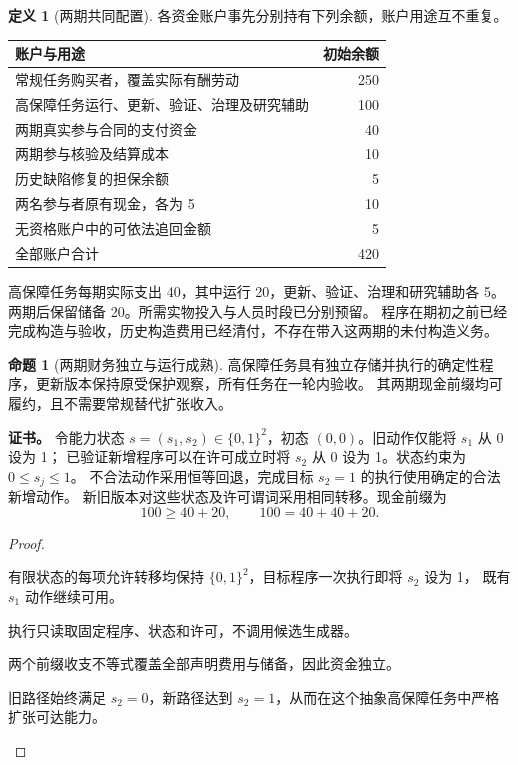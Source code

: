 \documentclass[UTF8,12pt,a4paper,openany,fontset=none,zihao=false]{ctexrep}
\theoremstyle{definition}
\newtheorem{definition}{定义}[chapter]
\newtheorem{proposition}{命题}[chapter]
\newenvironment{certificate}{\par\noindent\textbf{证书。}\ignorespaces}{\par}
\newcommand{\1}{\mathbf 1}
\begin{document}
\begin{definition}[两期共同配置]
各资金账户事先分别持有下列余额，账户用途互不重复。
\begin{center}
\begin{tabular}{p{}r}
\toprule
账户与用途 & 初始余额\\
\midrule
常规任务购买者，覆盖实际有酬劳动 & 250\\
高保障任务运行、更新、验证、治理及研究辅助 & 100\\
两期真实参与合同的支付资金 & 40\\
两期参与核验及结算成本 & 10\\
历史缺陷修复的担保余额 & 5\\
两名参与者原有现金，各为 5 & 10\\
无资格账户中的可依法追回金额 & 5\\
\midrule
全部账户合计 & 420\\
\bottomrule
\end{tabular}
\end{center}
高保障任务每期实际支出 40，其中运行 20，更新、验证、治理和研究辅助各 5。
两期后保留储备 20。所需实物投入与人员时段已分别预留。
程序在期初之前已经完成构造与验收，历史构造费用已经清付，不存在带入这两期的未付构造义务。
\end{definition}

\begin{proposition}[两期财务独立与运行成熟]
高保障任务具有独立存储并执行的确定性程序，更新版本保持原受保护观察，所有任务在一轮内验收。
其两期现金前缀均可履约，且不需要常规替代扩张收入。
\end{proposition}
\begin{certificate}
令能力状态 \(s=(s_1,s_2)\in\{0,1\}^2\)，初态 \((0,0)\)。旧动作仅能将 \(s_1\) 从 0 设为 1；
已验证新增程序可以在许可成立时将 \(s_2\) 从 0 设为 1。状态约束为 \(0\le s_j\le1\)。
不合法动作采用恒等回退，完成目标 \(s_2=1\) 的执行使用确定的合法新增动作。
新旧版本对这些状态及许可谓词采用相同转移。现金前缀为
\[
100\ge40+20,\qquad100=40+40+20.
\]
\end{certificate}
\begin{proof}
\begin{semanticsteps}
\item 有限状态的每项允许转移均保持 \(\{0,1\}^2\)，目标程序一次执行即将 \(s_2\) 设为 1，
既有 \(s_1\) 动作继续可用。
\item 执行只读取固定程序、状态和许可，不调用候选生成器。
\item 两个前缀收支不等式覆盖全部声明费用与储备，因此资金独立。
\item 旧路径始终满足 \(s_2=0\)，新路径达到 \(s_2=1\)，从而在这个抽象高保障任务中严格扩张可达能力。
\end{semanticsteps}
\end{proof}
\end{document}
